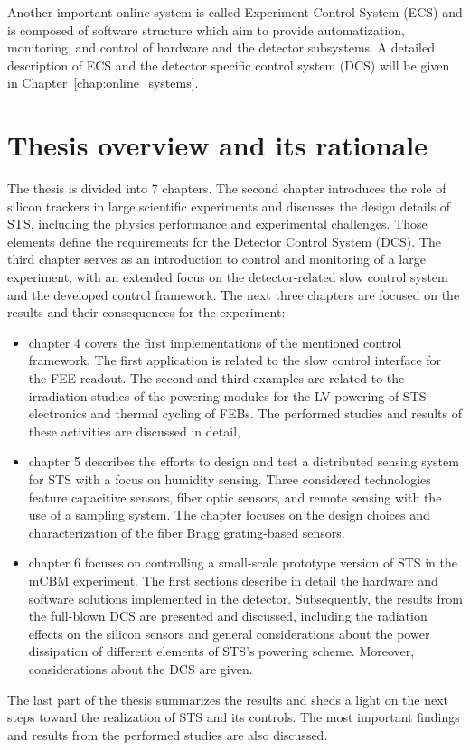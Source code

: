 Another important online system is called Experiment Control System (\gls{ECS}) and is composed of software structure which aim to provide automatization, monitoring, and control of hardware and the detector subsystems. A detailed description of \gls{ECS} and the detector specific control system (\gls{DCS}) will be given in Chapter~\ref{chap:online_systems}.



\section{Thesis overview and its rationale}
The thesis is divided into 7 chapters. The second chapter introduces the role of silicon trackers in large scientific experiments and discusses the design details of \gls{STS}, including the physics performance and experimental challenges. Those elements define the requirements for the Detector Control System (\gls{DCS}). The third chapter serves as an introduction to control and monitoring of a large experiment, with an extended focus on the detector-related slow control system and the developed control framework. The next three chapters are focused on the results and their consequences for the experiment:
\begin{itemize}
    \item chapter 4 covers the first implementations of the mentioned control framework. The first application is related to the slow control interface for the \gls{FEE} readout. The second and third examples are related to the irradiation studies of the powering modules for the \gls{LV} powering of \gls{STS} electronics and thermal cycling of \glspl{FEB}. The performed studies and results of these activities are discussed in detail,
    \item chapter 5 describes the efforts to design and test a distributed sensing system for \gls{STS} with a focus on humidity sensing. Three considered technologies feature capacitive sensors, fiber optic sensors, and remote sensing with the use of a sampling system. The chapter focuses on the design choices and characterization of the fiber Bragg grating-based sensors. 
    \item chapter 6 focuses on controlling a small-scale prototype version of \gls{STS} in the \gls{mCBM} experiment. The first sections describe in detail the hardware and software solutions implemented in the detector. Subsequently, the results from the full-blown \gls{DCS} are presented and discussed, including the radiation effects on the silicon sensors and general considerations about the power dissipation of different elements of \gls{STS}'s powering scheme. Moreover, considerations about the \gls{DCS} are given. 
\end{itemize}
The last part of the thesis summarizes the results and sheds a light on the next steps toward the realization of \gls{STS} and its controls. The most important findings and results from the performed studies are also discussed.